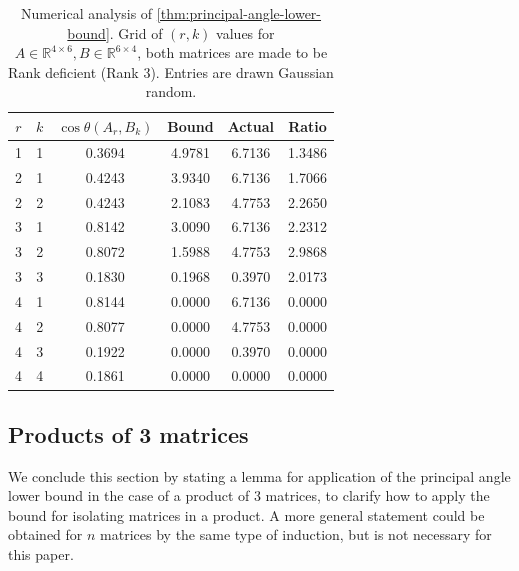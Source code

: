 \documentclass{article}
\newcommand{\prinangle}{\cos\theta}
\theoremstyle{plain}
\theoremstyle{definition}
\theoremstyle{remark}
\begin{document}
\begin{table}[h]
\centering
{}
\begin{tabular}{c c S[table-format=1.4] S[table-format=1.4] S[table-format=1.4] S[table-format=1.4]}
\toprule
$r$ & $k$ & {$\prinangle(A_r, B_k)$} & {Bound} & {Actual} & {Ratio} \\
 & 1 & 0.3694 & 4.9781 & 6.7136 & 1.3486 \\
2 & 1 & 0.4243 & 3.9340 & 6.7136 & 1.7066 \\
2 & 2 & 0.4243 & 2.1083 & 4.7753 & 2.2650 \\
3 & 1 & 0.8142 & 3.0090 & 6.7136 & 2.2312 \\
3 & 2 & 0.8072 & 1.5988 & 4.7753 & 2.9868 \\
3 & 3 & 0.1830 & 0.1968 & 0.3970 & 2.0173 \\
4 & 1 & 0.8144 & 0.0000 & 6.7136 & 0.0000 \\
4 & 2 & 0.8077 & 0.0000 & 4.7753 & 0.0000 \\
4 & 3 & 0.1922 & 0.0000 & 0.3970 & 0.0000 \\
4 & 4 & 0.1861 & 0.0000 & 0.0000 & 0.0000 \\
\bottomrule
\end{tabular}
\caption{Numerical analysis of \cref{thm:principal-angle-lower-bound}. Grid of $(r,k)$ values for $A \in \mathbb{R}^{4 \times 6}, B \in \mathbb{R}^{6 \times 4}$, both matrices are made to be Rank deficient (Rank 3). Entries are drawn Gaussian random.}
\label{tab:bound-k-r-rand-def}
\end{table}

\subsection{Products of 3 matrices}

We conclude this section by stating a lemma for application of the principal angle lower bound in the case of a product of 3 matrices, to clarify how to apply the bound for isolating matrices in a product. A more general statement could be obtained for $n$ matrices by the same type of induction, but is not necessary for this paper.
\end{document}
